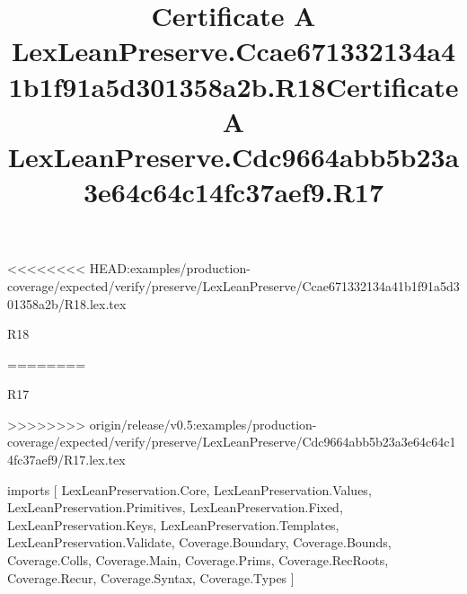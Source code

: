 <<<<<<<< HEAD:examples/production-coverage/expected/verify/preserve/LexLeanPreserve/Ccae671332134a41b1f91a5d301358a2b/R18.lex.tex
\begin{lexlean}{R18}
\title{Certificate A LexLeanPreserve.Ccae671332134a41b1f91a5d301358a2b.R18}
========
\begin{lexlean}{R17}
\title{Certificate A LexLeanPreserve.Cdc9664abb5b23a3e64c64c14fc37aef9.R17}
>>>>>>>> origin/release/v0.5:examples/production-coverage/expected/verify/preserve/LexLeanPreserve/Cdc9664abb5b23a3e64c64c14fc37aef9/R17.lex.tex
\begin{coremodule}
imports [
  LexLeanPreservation.Core,
  LexLeanPreservation.Values,
  LexLeanPreservation.Primitives,
  LexLeanPreservation.Fixed,
  LexLeanPreservation.Keys,
  LexLeanPreservation.Templates,
  LexLeanPreservation.Validate,
  Coverage.Boundary,
  Coverage.Bounds,
  Coverage.Colls,
  Coverage.Main,
  Coverage.Prims,
  Coverage.RecRoots,
  Coverage.Recur,
  Coverage.Syntax,
  Coverage.Types
]


\end{coremodule}
\end{lexlean}
\end{lexlean}
